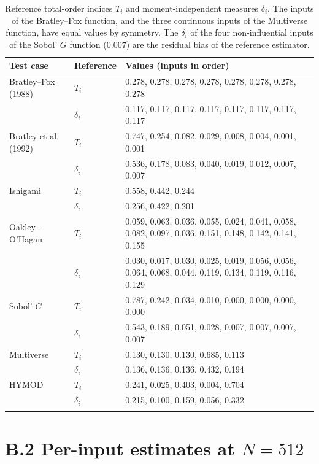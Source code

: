 \documentclass[11pt,a4paper]{article}
\begin{document}
\begin{table}[H]\centering\small
\begin{tabular}{@{}llp{10.9cm}@{}}\toprule
Test case & Reference & Values (inputs in order)\\ \midrule
Bratley--Fox (1988) & $T_i$ & 0.278, 0.278, 0.278, 0.278, 0.278, 0.278, 0.278, 0.278\\
 & $\delta_i$ & 0.117, 0.117, 0.117, 0.117, 0.117, 0.117, 0.117, 0.117\\ \addlinespace[2pt]
Bratley et al. (1992) & $T_i$ & 0.747, 0.254, 0.082, 0.029, 0.008, 0.004, 0.001, 0.001\\
 & $\delta_i$ & 0.536, 0.178, 0.083, 0.040, 0.019, 0.012, 0.007, 0.007\\ \addlinespace[2pt]
Ishigami & $T_i$ & 0.558, 0.442, 0.244\\
 & $\delta_i$ & 0.256, 0.422, 0.201\\ \addlinespace[2pt]
Oakley--O'Hagan & $T_i$ & 0.059, 0.063, 0.036, 0.055, 0.024, 0.041, 0.058, 0.082, 0.097, 0.036, 0.151, 0.148, 0.142, 0.141, 0.155\\
 & $\delta_i$ & 0.030, 0.017, 0.030, 0.025, 0.019, 0.056, 0.056, 0.064, 0.068, 0.044, 0.119, 0.134, 0.119, 0.116, 0.129\\ \addlinespace[2pt]
Sobol' $G$ & $T_i$ & 0.787, 0.242, 0.034, 0.010, 0.000, 0.000, 0.000, 0.000\\
 & $\delta_i$ & 0.543, 0.189, 0.051, 0.028, 0.007, 0.007, 0.007, 0.007\\ \addlinespace[2pt]
Multiverse & $T_i$ & 0.130, 0.130, 0.130, 0.685, 0.113\\
 & $\delta_i$ & 0.136, 0.136, 0.136, 0.432, 0.194\\ \addlinespace[2pt]
HYMOD & $T_i$ & 0.241, 0.025, 0.403, 0.004, 0.704\\
 & $\delta_i$ & 0.215, 0.100, 0.159, 0.056, 0.332\\ \addlinespace[2pt]
\bottomrule\end{tabular}
\caption{Reference total-order indices $T_i$ and moment-independent measures $\delta_i$. The inputs of the Bratley--Fox function, and the three continuous inputs of the Multiverse function, have equal values by symmetry. The $\delta_i$ of the four non-influential inputs of the Sobol' $G$ function ($0.007$) are the residual bias of the reference estimator.}
\label{tab:refs}
\end{table}

\section*{B.2 Per-input estimates at $N=512$}
\end{document}
